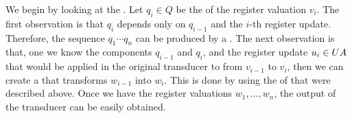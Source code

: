 We begin by looking at the .  Let $q_i \in Q$ be the  of the register valuation $v_i$. The first observation is that $q_i$ depends only on $q_{i-1}$ and the $i$-th register update. Therefore, the sequence $q_1 \cdots q_n$ can be produced by a . The next observation is that, one we know the components $q_{i-1}$ and $q_{i}$, and the register update $u_i \in \functoru A$ that would be applied in the original transducer to from $v_{i-1}$ to $v_i$, then we can create a   that transforms $w_{i-1}$ into $w_i$. This is done by using the  of  that were described above. Once we have the register valuations $w_1,\ldots,w_n$, the output of the transducer can be easily obtained.

